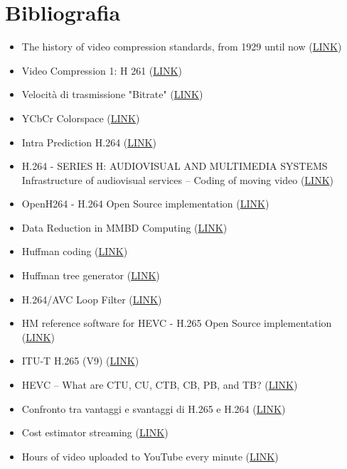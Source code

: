 \documentclass[a4paper,12pt, oneside]{article}
\begin{document}
\section{Bibliografia}

\begin{multicols}{2}
\begin{itemize}[label={}]
    \item The history of video compression standards, from 1929 until now (\href{https://api.video/blog/video-trends/the-history-of-video-compression-starts-in-1929/}{LINK})
    \item Video Compression 1: H 261 (\href{https://users.ece.utexas.edu/~ryerraballi/MSB/pdfs/M4L2.pdf}{LINK})
    \item Velocità di trasmissione "Bitrate" (\href{https://it.wikipedia.org/wiki/Velocit%C3%A0_di_trasmissione}{LINK})
    \item YCbCr Colorspace (\href{https://en.wikipedia.org/wiki/YCbCr}{LINK})
    \item Intra Prediction H.264 (\href{https://www.sciencedirect.com/topics/computer-science/intra-prediction}{LINK})

    \item H.264 - SERIES H: AUDIOVISUAL AND MULTIMEDIA SYSTEMS 
        Infrastructure of audiovisual services – Coding of moving 
        video (\href{https://www.itu.int/rec/T-REC-H.264-202108-I/en}{LINK})
    \item OpenH264 - H.264 Open Source implementation (\href{https://github.com/cisco/openh264}{LINK})
    \item Data Reduction in MMBD Computing  (\href{https://www.researchgate.net/publication/334546287_Data_Reduction_in_MMBD_Computing#pf17}{LINK})
    \item Huffman coding (\href{https://en.wikipedia.org/wiki/Huffman_coding}{LINK})
    \item Huffman tree generator (\href{https://suhaan-bhandary.github.io/Huffman-Coding/}{LINK})

    \item H.264/AVC Loop Filter (\href{https://www.vcodex.com/h264avc-loop-filter}{LINK})
    \item HM reference software for HEVC - H.265 Open Source implementation (\href{https://vcgit.hhi.fraunhofer.de/jvet/HM}{LINK})
    \item ITU-T H.265 (V9) (\href{https://www.itu.int/rec/T-REC-H.265-202309-I/en}{LINK})
    \item HEVC – What are CTU, CU, CTB, CB, PB, and TB? (\href{https://codesequoia.wordpress.com/2012/10/28/hevc-ctu-cu-ctb-cb-pb-and-tb/}{LINK})
    \item Confronto tra vantaggi e svantaggi di H.265 e H.264 (\href{https://zhuanlan.zhihu.com/p/519752821}{LINK})
    \item Cost estimator streaming (\href{https://ivs.rocks/calculator}{LINK})
    \item Hours of video uploaded to YouTube every minute (\href{https://www.statista.com/statistics/259477/hours-of-video-uploaded-to-youtube-every-minute/}{LINK})


\end{itemize}
\end{multicols}
\end{document}
